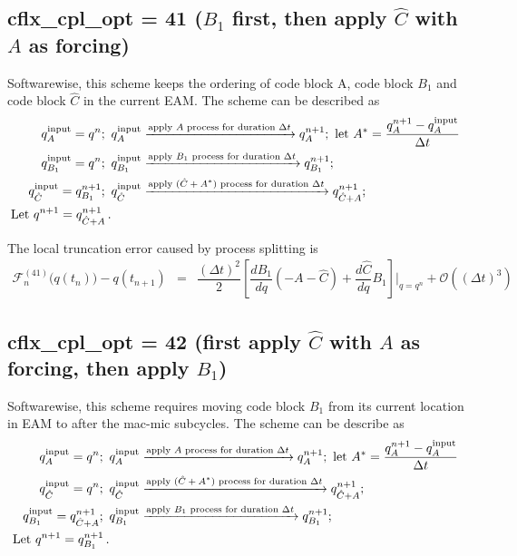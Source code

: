 \documentclass[12pt]{article}
\begin{document}
\subsection{{\sf cflx\_cpl\_opt = 41} ($B_1$ first, then apply $\hat{C}$ with $A$ as forcing)}

Softwarewise, this scheme keeps the ordering of code block A, code block $B_1$ and code block $\hat{C}$ in the current EAM. The scheme can be described as
%
\begin{align*}
q^{\rm input}_{A} = q^n;\,\,\,
&q^{\rm input}_{A} \xrightarrow{\text{apply $A$ process for duration $\Delta t$}} q^{n+1}_{A};\,\,
\text{let}\,\, {A}^* = \dfrac{q^{n+1}_{A} - q^{\rm input}_{A}}{\Delta t} \\
%
q^{\rm input}_{B_1} = q^n;\,\,\, 
& q^{\rm input}_{B_1} \xrightarrow{\text{apply $B_1$ process for duration $\Delta t$}} q^{n+1}_{B_1};\,\, 
\\
%
q^{\rm input}_{\hat{C}} = q^{n+1}_{B_1};\,\,\, 
& q^{\rm input}_{\hat{C}}\xrightarrow{\text{apply $(\hat{C}+A^*)$ process for duration $\Delta t$}} q^{n+1}_{\hat{C}+A};\,\, 
 \\
%
\text{Let}\,\, q^{n+1} = q^{n+1}_{\hat{C}+A} \,.
\end{align*}

The local truncation error caused by process splitting is
\begin{eqnarray}
\mathcal{F}_n^{(41)}\Big(q(t_n)\Big) - q(t_{n+1}) 
&=& \dfrac{(\Delta t)^2}{2}\left[  \dfrac{dB_1}{dq}(-A-\hat{C}) + \dfrac{d\hat{C}}{dq}B_1\right]\bigg|_{q=q^n}
+\mathcal{O}\left( (\Delta t)^3\right)
\end{eqnarray}



\subsection{{\sf cflx\_cpl\_opt = 42} (first apply $\hat{C}$ with $A$ as forcing, then apply $B_1$)}

Softwarewise, this scheme requires moving code block $B_1$ from its current location in EAM to after the mac-mic subcycles.
The scheme can be describe as
%
\begin{align*}
q^{\rm input}_{A} = q^n;\,\,\,
&q^{\rm input}_{A} \xrightarrow{\text{apply $A$ process for duration $\Delta t$}} q^{n+1}_{A};\,\,
\text{let}\,\, {A}^* = \dfrac{q^{n+1}_{A} - q^{\rm input}_{A}}{\Delta t} \\
%
q^{\rm input}_{\hat{C}} = q^{n};\,\,\, 
& q^{\rm input}_{\hat{C}}\xrightarrow{\text{apply $(\hat{C}+A^*)$ process for duration $\Delta t$}} q^{n+1}_{\hat{C}+A};\,\, 
 \\
%
q^{\rm input}_{B_1} = q^{n+1}_{\hat{C}+A};\,\,\, 
& q^{\rm input}_{B_1} \xrightarrow{\text{apply $B_1$ process for duration $\Delta t$}} q^{n+1}_{B_1};\,\, 
\\
\text{Let}\,\, q^{n+1} = q^{n+1}_{B_1} \,.
\end{align*}
\end{document}
